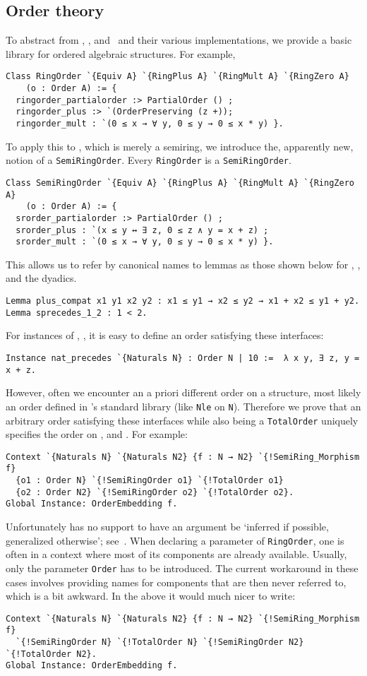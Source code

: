 \documentclass[a4paper,10pt,runningheads]{llncs}
\begin{document}
\subsection{Order theory}
To abstract from , ,  and \R\ and their various implementations, we provide a basic library for ordered algebraic structures. For example,
\begin{lstlisting}
Class RingOrder `{Equiv A} `{RingPlus A} `{RingMult A} `{RingZero A} 
	(o : Order A) := { 
  ringorder_partialorder :> PartialOrder () ;
  ringorder_plus :> `(OrderPreserving (z +));
  ringorder_mult : `(0 ≤ x → ∀ y, 0 ≤ y → 0 ≤ x * y) }.
\end{lstlisting}
To apply this to , which is merely a semiring, we introduce the, apparently new, notion of a \lstinline|SemiRingOrder|. Every \lstinline|RingOrder| is a \lstinline|SemiRingOrder|.
\begin{lstlisting}
Class SemiRingOrder `{Equiv A} `{RingPlus A} `{RingMult A} `{RingZero A} 
	(o : Order A) := { 
  srorder_partialorder :> PartialOrder () ;
  srorder_plus : `(x ≤ y ↔ ∃ z, 0 ≤ z ∧ y = x + z) ;
  srorder_mult : `(0 ≤ x → ∀ y, 0 ≤ y → 0 ≤ x * y) }.
\end{lstlisting}
This allows us to refer by canonical names to lemmas as those shown below for , ,  and the dyadics.
\begin{lstlisting}
Lemma plus_compat x1 y1 x2 y2 : x1 ≤ y1 → x2 ≤ y2 → x1 + x2 ≤ y1 + y2.
Lemma sprecedes_1_2 : 1 < 2.
\end{lstlisting}
For instances of , ,  it is easy to define an order satisfying these interfaces:
\begin{lstlisting}
Instance nat_precedes `{Naturals N} : Order N | 10 :=  λ x y, ∃ z, y = x + z.
\end{lstlisting}
However, often we encounter an a priori different order on a structure, most likely an order defined in \Coq's standard library (like \lstinline|Nle| on \lstinline|N|). Therefore we prove that an arbitrary order satisfying these interfaces while also being a \lstinline|TotalOrder| uniquely specifies the order on ,  and . For example:
\begin{lstlisting}
Context `{Naturals N} `{Naturals N2} {f : N → N2} `{!SemiRing_Morphism f}
  {o1 : Order N} `{!SemiRingOrder o1} `{!TotalOrder o1}
  {o2 : Order N2} `{!SemiRingOrder o2} `{!TotalOrder o2}.
Global Instance: OrderEmbedding f.
\end{lstlisting}
Unfortunately \Coq{} has no support to have an argument be `inferred if possible, generalized otherwise'; see~\cite{math-classes}. When declaring a parameter of \lstinline|RingOrder|, one is often in a context where most of its components are already available. Usually, only the parameter \lstinline|Order| has to be introduced. The current workaround in these cases involves providing names for components that are then never referred to, which is a bit awkward. In the above it would much nicer to write:
\begin{lstlisting}
Context `{Naturals N} `{Naturals N2} {f : N → N2} `{!SemiRing_Morphism f}
  `{!SemiRingOrder N} `{!TotalOrder N} `{!SemiRingOrder N2} `{!TotalOrder N2}.
Global Instance: OrderEmbedding f.
\end{lstlisting}
\end{document}
